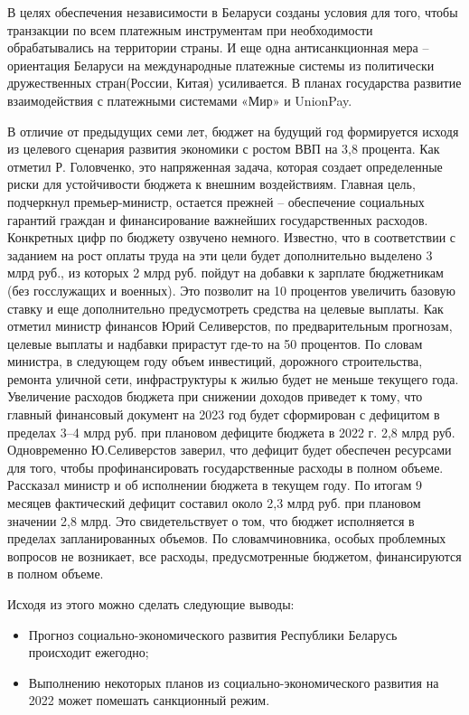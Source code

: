 \documentclass[14pt,a4paper]{article}
\begin{document}
    \par
    В целях обеспечения независимости в Беларуси созданы условия для того, чтобы транзакции по всем платежным инструментам при необходимости обрабатывались на территории страны.
    И еще одна антисанкционная мера – ориентация Беларуси на международные платежные системы из политически дружественных стран(России, Китая) усиливается.
    В планах государства развитие взаимодействия с платежными системами «Мир» и UnionPay.
    \par
    В отличие от предыдущих семи
    лет, бюджет на будущий год формируется исходя из целевого сценария развития экономики с ростом ВВП на 3,8 процента.
    Как отметил Р. Головченко, это напряженная задача, которая создает определенные риски для устойчивости бюджета к внешним воздействиям.
    Главная цель, подчеркнул премьер-министр, остается прежней – обеспечение социальных гарантий граждан и финансирование важнейших государственных расходов.
    Конкретных цифр по бюджету озвучено немного.
    Известно, что в соответствии с заданием на рост оплаты труда на эти цели будет дополнительно выделено 3 млрд руб., из которых 2 млрд руб.
    пойдут на добавки к зарплате бюджетникам (без госслужащих и военных).
    Это позволит на 10 процентов увеличить базовую ставку и еще дополнительно предусмотреть средства на целевые выплаты.
    Как отметил министр финансов Юрий Селиверстов, по предварительным прогнозам, целевые выплаты и надбавки прирастут где-то на 50 процентов.
    По словам министра, в следующем году объем инвестиций, дорожного строительства, ремонта уличной сети, инфраструктуры к жилью будет не меньше текущего года.
    Увеличение расходов бюджета при снижении доходов приведет к тому, что главный финансовый документ на 2023 год будет сформирован с дефицитом в пределах 3–4 млрд руб. при плановом дефиците бюджета в 2022 г. 2,8 млрд руб.
    Одновременно Ю.Селиверстов заверил, что дефицит будет обеспечен ресурсами для того, чтобы профинансировать государственные расходы в полном объеме.
    Рассказал министр и об исполнении бюджета в текущем году.
    По итогам 9 месяцев фактический дефицит составил около 2,3 млрд руб. при плановом значении 2,8 млрд.
    Это свидетельствует о том, что бюджет исполняется в пределах запланированных объемов.
    По словамчиновника, особых проблемных вопросов не возникает, все расходы, предусмотренные бюджетом, финансируются в полном объеме.
    \par
    Исходя из этого можно сделать следующие выводы:
    \begin{itemize}
        \item Прогноз социально-экономического развития Республики Беларусь происходит ежегодно;
        \item Выполнению некоторых планов из социально-экономического развития на 2022 может помешать санкционный режим.
    \end{itemize}
\end{document}
